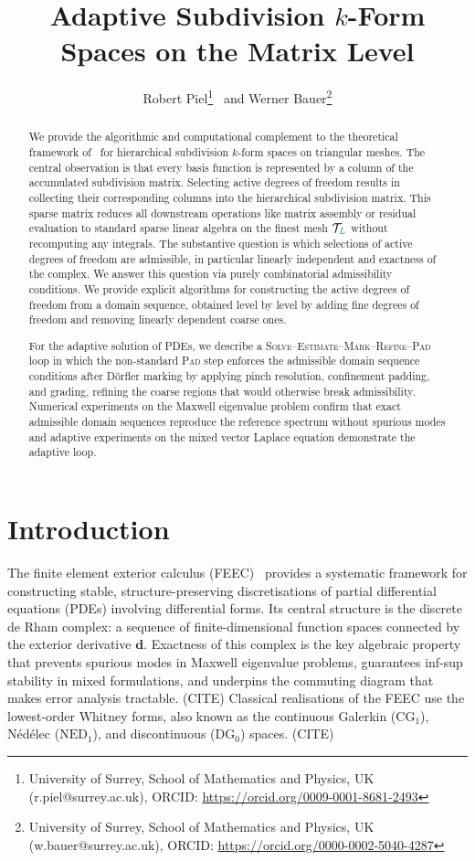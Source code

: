 \documentclass[a4paper, 12pt]{article}
\title{Adaptive Subdivision $k$-Form Spaces on the Matrix Level}
\author{Robert Piel\footnote{University of Surrey, School of Mathematics and Physics, UK (r.piel@surrey.ac.uk), ORCID: \url{https://orcid.org/0009-0001-8681-2493}} \ and
Werner Bauer\footnote{University of Surrey, School of Mathematics and Physics, UK (w.bauer@surrey.ac.uk), ORCID: \url{https://orcid.org/0000-0002-5040-4287}}
}
\newcommand{\checkit}[1]{{\color{red}#1}}
\newcommand{\highlight}[1]{{\color{cyan} #1}}
\newcommand{\needcite}{\highlight{(CITE)}} %
\newcommand{\guidance}[1]{{\color{lime!70!black} #1}}
\newcommand{\green}{\color{ForestGreen}}
\newcommand{\T}{\mathcal{T}}
\renewcommand{\L}{{\green L}}
\newcommand{\extd}{\mathbf{d}}
\theoremstyle{definition}
\theoremstyle{plain}
\numberwithin{equation}{section}
\begin{document}
\maketitle

\vspace{-2.0em}

\begin{abstract}
We provide the algorithmic and computational complement to the theoretical framework of~\guidance{\cite{companion_paper}} for hierarchical subdivision $k$-form spaces on triangular meshes. The central observation is that every basis function is represented by a column of the accumulated subdivision matrix. Selecting active degrees of freedom results in collecting their corresponding columns into the hierarchical subdivision matrix. This sparse matrix reduces all downstream operations like matrix assembly or residual evaluation to standard sparse linear algebra on the finest mesh $\T_\L$ without recomputing any integrals. The substantive question is which selections of active degrees of freedom are admissible, in particular linearly independent and exactness of the complex. We answer this question via purely combinatorial admissibility conditions. We provide explicit algorithms for constructing the active degrees of freedom from a domain sequence, obtained level by level by adding fine degrees of freedom and removing linearly dependent coarse ones.

For the adaptive solution of PDEs, we describe a \textsc{Solve}--\textsc{Estimate}--\textsc{Mark}--\textsc{Refine}--\textsc{Pad} loop in which the non-standard \textsc{Pad} step enforces the admissible domain sequence conditions after Dörfler marking by applying pinch resolution, \checkit{confinement padding}, and grading, refining the coarse regions that would otherwise break admissibility. Numerical experiments on the Maxwell eigenvalue problem confirm that exact admissible domain sequences reproduce the reference spectrum without spurious modes and adaptive experiments on the mixed vector Laplace equation demonstrate the adaptive loop.
\end{abstract}

\tableofcontents

\section{Introduction}

The finite element exterior calculus (FEEC)~\cite{Arnold.FEEC} provides a systematic framework for constructing stable, structure-preserving discretisations of partial differential equations (PDEs) involving differential forms. Its central structure is the discrete de Rham complex: a sequence of finite-dimensional function spaces connected by the exterior derivative $\extd$. Exactness of this complex is the key algebraic property that prevents spurious modes in Maxwell eigenvalue problems, guarantees inf-sup stability in mixed formulations, and underpins the commuting diagram that makes error analysis tractable.\needcite{} Classical realisations of the FEEC use the lowest-order Whitney forms, also known as the continuous Galerkin ($\mathrm{CG}_1$), N\'ed\'elec ($\mathrm{NED}_1$), and discontinuous ($\mathrm{DG}_0$) spaces.\needcite{}
\end{document}
